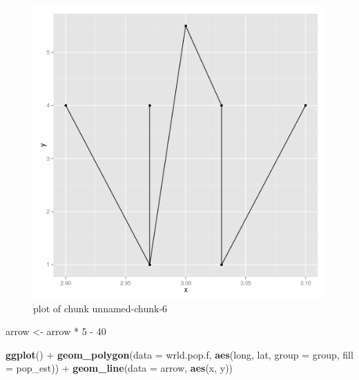 \documentclass[]{article}
\makeatletter
\newenvironment{Shaded}{}{}
\newcommand{\KeywordTok}[1]{\textcolor[rgb]{0.00,0.44,0.13}{\textbf{{#1}}}}
\newcommand{\DataTypeTok}[1]{\textcolor[rgb]{0.56,0.13,0.00}{{#1}}}
\newcommand{\DecValTok}[1]{\textcolor[rgb]{0.25,0.63,0.44}{{#1}}}
\newcommand{\StringTok}[1]{\textcolor[rgb]{0.25,0.44,0.63}{{#1}}}
\newcommand{\NormalTok}[1]{{#1}}
\def\maxwidth{\ifdim\Gin@nat@width>\linewidth\linewidth
\else\Gin@nat@width\fi}
\let\Oldincludegraphics\includegraphics
\renewcommand{\includegraphics}[1]{\Oldincludegraphics[width=\maxwidth]{#1}}
\makeatother
\begin{document}
\begin{figure}[htbp]
\centering
\includegraphics{figure/unnamed-chunk-62.png}
\caption{plot of chunk unnamed-chunk-6}
\end{figure}

\begin{Shaded}
\begin{Highlighting}[]
\NormalTok{arrow <-}\StringTok{ }\NormalTok{arrow *}\StringTok{ }\DecValTok{5} \NormalTok{-}\StringTok{ }\DecValTok{40}

\KeywordTok{ggplot}\NormalTok{() +}\StringTok{ }\KeywordTok{geom_polygon}\NormalTok{(}\DataTypeTok{data =} \NormalTok{wrld.pop.f, }\KeywordTok{aes}\NormalTok{(long, lat, }\DataTypeTok{group =} \NormalTok{group, }\DataTypeTok{fill =} \NormalTok{pop_est)) +}\StringTok{ }
\StringTok{    }\KeywordTok{geom_line}\NormalTok{(}\DataTypeTok{data =} \NormalTok{arrow, }\KeywordTok{aes}\NormalTok{(x, y))}
\end{Highlighting}
\end{Shaded}
\end{document}
